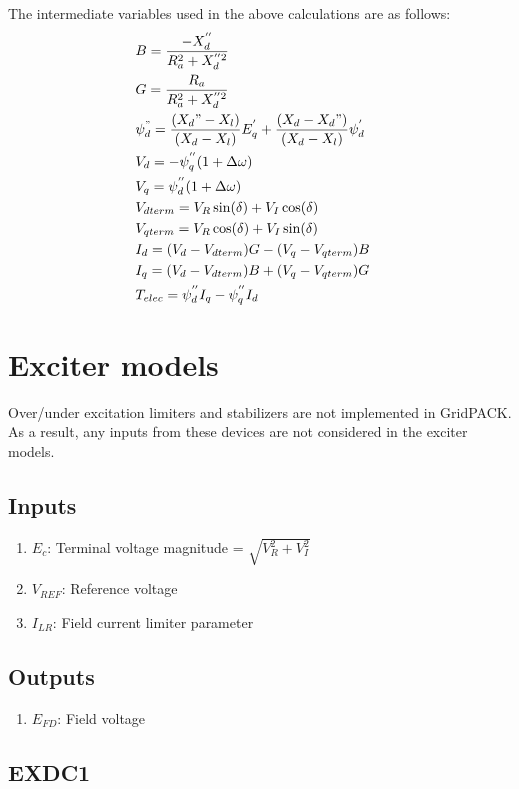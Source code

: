 \documentclass[12pt]{article}
\newcommand{\dw}{\Delta\omega}
\newcommand{\Vref}{V_{REF}}
\begin{document}
The intermediate variables used in the above calculations are as follows:
\begin{align*}
  &B = \dfrac{-X^{''}_d}{R^2_a + X^{''2}_d}&\\
 &G = \dfrac{R_a}{R^2_a+X^{''2}_d}&\\
 &\psi^{"}_{d}=\dfrac{(X_d"-X_l)}{(X_d-X_l)}E^{'}_q+\dfrac{(X_d-X_d")}{(X_d-X_l)}\psi^{'}_d&\\
  &V_d=-\psi^{''}_{q}(1+{\Delta\omega})&\\
  &V_q=\psi^{''}_{d}(1+{\dw})&\\
  &V_{dterm} = V_R\sin({\delta})+V_I\cos({\delta})&\\
  &V_{qterm} = V_R\cos({\delta})+V_I\sin({\delta})&\\
  &I_d = (V_d-V_{dterm})G-(V_q-V_{qterm})B&\\
  &I_q = (V_d-V_{dterm})B+(V_q-V_{qterm})G& \\
   &T_{elec}=\psi^{''}_{d}I_q-\psi^{''}_{q}I_d&
  \end{align*}

\section{Exciter models}
Over/under excitation limiters and stabilizers are not implemented in GridPACK. As a result, any inputs from these devices are not considered in the exciter models.

\subsection{Inputs}
\begin{enumerate}
  \item $E_c$: Terminal voltage magnitude = $\sqrt{V^{2}_R + V^{2}_I}$
  \item $\Vref$: Reference voltage
  \item $I_{LR}$: Field current limiter parameter
\end{enumerate}

\subsection{Outputs}
\begin{enumerate}
  \item $E_{FD}$: Field voltage
\end{enumerate}

\subsection{EXDC1}
\end{document}
